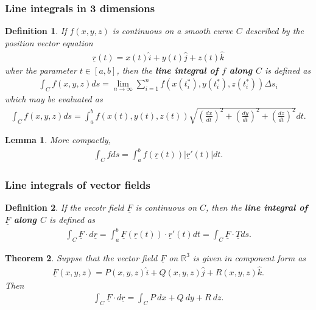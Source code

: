 \documentclass{article}
\theoremstyle{sltheorem}
\newtheorem{definition}{Definition}[section]
\newtheorem{theorem}{Theorem}[section]
\newtheorem{lemma}[theorem]{Lemma}
\newcommand{\R}{\mathbb{R}}
\newcommand{\ih}{\widehat i}
\newcommand{\jh}{\widehat j}
\newcommand{\kh}{\widehat k}
\renewcommand{\vec}{\underline}
\newcommand{\dv}[1]{\vec #1'}
\newcommand*\B[1]{\textbf{#1}}
\begin{document}
\subsubsection{Line integrals in 3 dimensions}
\begin{definition}
    If $f(x,y,z)$ is continuous on a smooth curve $C$ described by the
    position vector equation
    \begin{align*}
        \vec r(t) = x(t)\ih + y(t)\jh + z(t)\kh
    \end{align*}
    wher the parameter $t\in[a,b]$, then the \B{line integral of $f$ along $C$}
    is defined as
    \begin{align*}
        \int_C f(x,y,z)ds = \lim_{n\to\infty}\sum_{i=1}^n f(x(t_i^*), y(t_i^*), z(t_i^*))\Delta s_i
    \end{align*}
    which may be evaluated as
    \begin{align*}
        \int_C f(x,y,z)ds = \int_a^b f(x(t), y(t), z(t))\sqrt{\left(\frac{dx}{dt}\right)^2 + \left(\frac{dy}{dt}\right)^2 + \left(\frac{dz}{dt}\right)^2}dt.
    \end{align*}
\end{definition}
\begin{lemma}
    More compactly,
    \begin{align*}
        \int_C f ds = \int_a^b f(\vec r(t))|\dv r(t)|dt.
    \end{align*}
\end{lemma}
\subsubsection{Line integrals of vector fields}
\begin{definition}
    If the vecotr field $\vec F$ is continuous on $C$, then the
    \B{line integral of $\vec F$ along $C$} is defined as
    \begin{align*}
        \int_C \vec F\cdot d\vec r = \int_a^b \vec F(\vec r(t))\cdot \dv r(t)dt
        = \int_C \vec F\cdot \vec T ds.
    \end{align*}
\end{definition}
\begin{theorem}
    Suppse that the vector field $\vec F$ on $\R^3$ is given in component
    form as
    \begin{align*}
        \vec F(x,y,z) = P(x,y,z)\ih + Q(x,y,z)\jh + R(x,y,z)\kh.
    \end{align*}
    Then
    \begin{align*}
        \int_C \vec F\cdot d\vec r = \int_C P\:dx + Q\:dy + R\:dz.
    \end{align*}
\end{theorem}
\end{document}
